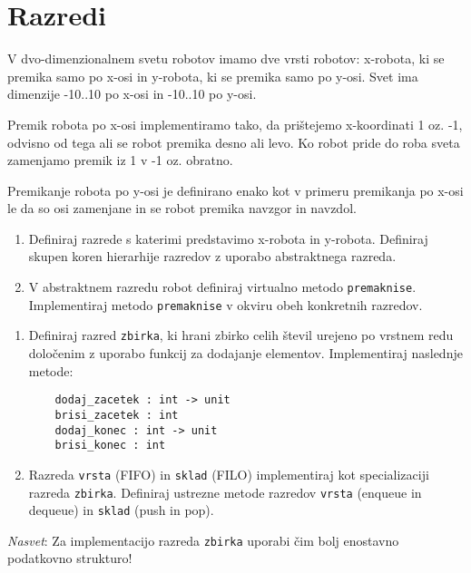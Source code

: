 \section{Razredi}


\begin{ex}
  V dvo-dimenzionalnem svetu robotov imamo dve vrsti robotov:
  x-robota, ki se premika samo po x-osi in y-robota, ki se premika
  samo po y-osi. Svet ima dimenzije -10..10 po x-osi in -10..10 po
  y-osi.

  Premik robota po x-osi implementiramo tako, da pri\v stejemo
  x-koordinati 1 oz. -1, odvisno od tega ali se robot premika desno
  ali levo. Ko robot pride do roba sveta zamenjamo premik iz 1 v -1
  oz. obratno.

  Premikanje robota po y-osi je definirano enako kot v primeru
  premikanja po x-osi le da so osi zamenjane in se robot premika
  navzgor in navzdol.

  \begin{enumerate}
  \item Definiraj razrede s katerimi predstavimo x-robota in
    y-robota. Definiraj skupen koren hierarhije razredov z uporabo
    abstraktnega razreda.

  \item V abstraktnem razredu robot definiraj virtualno metodo
    \texttt{premaknise}. Implementiraj metodo \texttt{premaknise} v
    okviru obeh konkretnih razredov.
  \end{enumerate}




\end{ex} 
\begin{ex}
  \begin{enumerate}
  \item Definiraj razred \texttt{zbirka}, ki hrani zbirko celih \v
    stevil urejeno po vrstnem redu dolo\v cenim z uporabo funkcij za
    dodajanje elementov. Implementiraj naslednje metode:

    \begin{verbatim}
    dodaj_zacetek : int -> unit
    brisi_zacetek : int 
    dodaj_konec : int -> unit
    brisi_konec : int  
    \end{verbatim}

  \item Razreda \texttt{vrsta} (FIFO) in \texttt{sklad} (FILO)
    implementiraj kot specializaciji razreda
    \texttt{zbirka}. Definiraj ustrezne metode razredov \texttt{vrsta}
    (enqueue in dequeue) in \texttt{sklad} (push in pop).
  \end{enumerate}

  \emph{Nasvet}: Za implementacijo razreda \texttt{zbirka} uporabi \v
  cim bolj enostavno podatkovno strukturo!



\end{ex} 

